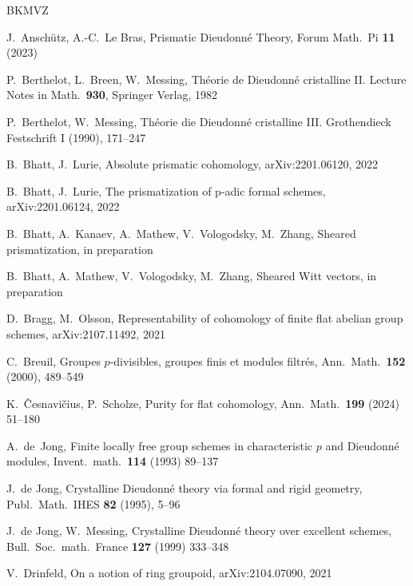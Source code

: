 \documentclass[a4paper,11pt]{amsart}
\theoremstyle{plain}
\theoremstyle{definition}
\theoremstyle{remark}
\numberwithin{equation}{section}
\newcommand{\cclearpage}{}%
\begin{document}
\cclearpage
\begin{thebibliography}{BKMVZ}

J.~Ansch\"utz, A.-C.~Le Bras,
Prismatic Dieudonn\'e Theory,
Forum Math.\ Pi {\bf 11} (2023)

P.~Berthelot, L.~Breen, W.~Messing,
Th\'{e}orie de Dieudonn\'{e} cristalline II.
Lecture Notes in Math.\ {\bf 930}, Springer Verlag, 1982 

P.~Berthelot, W.~Messing,
Th\'eorie die Dieudonn\'e cristalline III.
Grothendieck Festschrift I (1990), 171--247

B.~Bhatt, J.~Lurie, 
Absolute prismatic cohomology,
arXiv:2201.06120, 2022

B.~Bhatt, J.~Lurie, 
The prismatization of p-adic formal schemes,
arXiv:2201.06124, 2022

B.~Bhatt, A.~Kanaev, A.~Mathew, V.~Vologodsky, M.~Zhang, 
Sheared prismatization, in preparation

B.~Bhatt, A.~Mathew, V.~Vologodsky, M.~Zhang,
Sheared Witt vectors, in preparation

D.~Bragg, M.~Olsson,
Representability of cohomology of finite flat abelian group schemes,
arXiv:2107.11492, 2021

C.~Breuil,
Groupes $p$-divisibles, groupes finis et modules filtr\'es,
Ann.\ Math.\ {\bf 152} (2000), 489--549

K.~\v Cesnavi\v cius, P.~Scholze, 
Purity for flat cohomology,
Ann.\ Math.\ {\bf 199} (2024) 51--180

A.~de~Jong, 
Finite locally free group schemes in characteristic $p$ and Dieudonn\'e modules, 
Invent.~math.\ {\bf 114} (1993) 89--137

J.~de Jong,
Crystalline Dieudonn\'e theory via formal and rigid geometry,
Publ.~Math.~IHES {\bf 82} (1995), 5--96

J.~de Jong, W.~Messing,
Crystalline Dieudonn\'e theory over excellent schemes,
Bull.\ Soc.\ math.\ France {\bf 127} (1999) 333--348

V.~Drinfeld, 
On a notion of ring groupoid, 
arXiv:2104.07090, 2021


\end{thebibliography}
\end{document}
